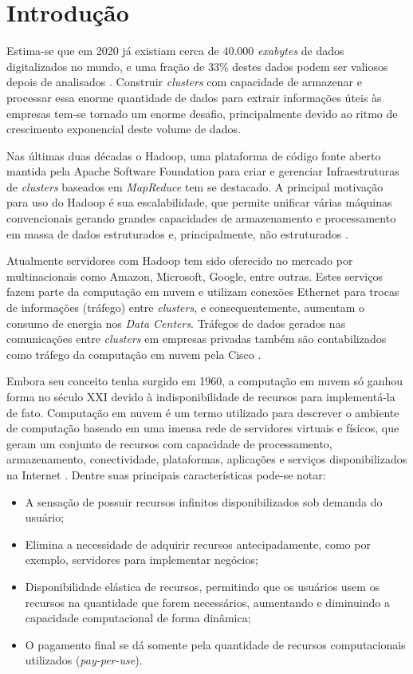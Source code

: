 \chapter{Introdução}


Estima-se que em 2020 já existiam cerca de 40.000 \emph{exabytes} de dados digitalizados no mundo, e uma fração de 33\% destes dados podem ser valiosos depois de analisados \cite{gantz2012digital}. Construir \emph{clusters} com capacidade de armazenar e processar essa enorme quantidade de dados para extrair informações úteis às empresas tem-se tornado um enorme desafio, principalmente devido ao ritmo de crescimento exponencial deste volume de dados.

Nas últimas duas décadas o Hadoop, uma plataforma de código fonte aberto mantida pela Apache Software Foundation para criar e gerenciar Infraestruturas de \emph{clusters} baseados em \emph{MapReduce} tem se destacado. A principal motivação para uso do Hadoop é sua escalabilidade, que permite unificar várias máquinas convencionais gerando grandes capacidades de armazenamento e processamento em massa de dados estruturados e, principalmente, não estruturados \cite{goldman2012apache}.

Atualmente servidores com Hadoop tem sido oferecido no mercado por multinacionais como Amazon, Microsoft, Google, entre outras. Estes serviços fazem parte da computação em nuvem e utilizam conexões Ethernet para trocas de informações (tráfego) entre \emph{clusters}, e consequentemente, aumentam o consumo de energia nos \emph{Data  Centers}. Tráfegos de dados gerados nas comunicações entre \emph{clusters} em empresas privadas também são contabilizados como tráfego da computação em nuvem pela Cisco \cite{cisco2020cisco}.

Embora seu conceito tenha surgido em 1960, a computação em nuvem só ganhou forma no século XXI devido à indisponibilidade de recursos para implementá-la de fato. Computação em nuvem é um termo utilizado para descrever o ambiente de computação baseado em uma imensa rede de servidores virtuais e físicos, que geram um conjunto de recursos com capacidade de processamento, armazenamento, conectividade, plataformas, aplicações e serviços disponibilizados na Internet \cite {taurion2009cloud}. Dentre suas principais características pode-se notar:

\begin{itemize}
\item A sensação de possuir recursos infinitos disponibilizados sob demanda do usuário;
\item Elimina a necessidade de adquirir recursos antecipadamente, como por exemplo, servidores para implementar negócios;
\item Disponibilidade elástica de recursos, permitindo que os usuários usem os recursos na quantidade que forem necessários, aumentando e diminuindo a capacidade computacional de forma dinâmica;
\item O pagamento final se dá somente pela quantidade de recursos computacionais utilizados (\emph{pay-per-use}).
\end{itemize}


